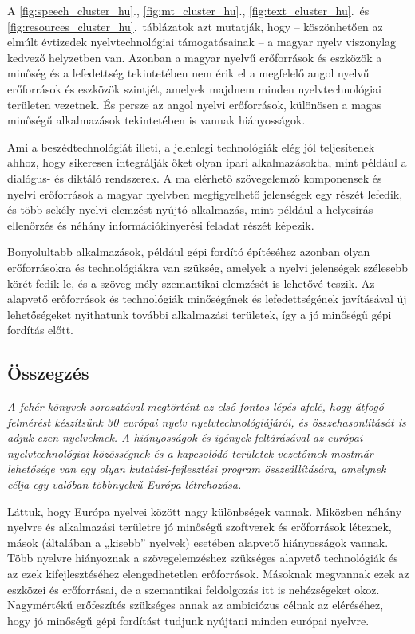 \begin{multicols}{2}
A \ref{fig:speech_cluster_hu}., \ref{fig:mt_cluster_hu}., \ref{fig:text_cluster_hu}.\ és \ref{fig:resources_cluster_hu}.~táblázatok azt mutatják, hogy -- köszönhetően az elmúlt évtizedek nyelv\-tech\-no\-ló\-giai támogatásainak -- a ma\-gyar nyelv viszonylag kedvező hely\-zet\-ben van. Azonban a magyar nyelvű erőforrások és eszközök a minőség és a lefedettség tekintetében nem érik el a megfelelő angol nyelvű erőforrások és esz\-kö\-zök szintjét, amelyek majdnem minden nyelvtechnológiai területen vezetnek. És persze az angol nyelvi erőforrások, különösen a magas minőségű alkalmazások tekintetében is vannak hiányosságok.

Ami a beszédtechnológiát illeti, a jelenlegi technológiák elég jól teljesítenek ahhoz, hogy sikeresen integrálják őket olyan ipari alkalmazásokba, mint például a dialógus- és diktáló rendszerek. A ma elérhető szövegelemző komponensek és nyelvi erőforrások a magyar nyelvben megfigyelhető jelenségek egy részét lefedik, és több sekély nyelvi elemzést nyújtó alkalmazás, mint például a helyesírás-ellenőrzés és néhány információkinyerési feladat részét képezik. 

Bonyolultabb alkalmazások, például gépi fordító építéséhez azonban olyan erőforrásokra és technológiákra van szükség, amelyek a nyelvi jelenségek szélesebb körét fedik le, és a szöveg mély szemantikai elemzését is lehetővé teszik. Az alapvető erőforrások és technológiák minőségének és lefedettségének javításával új lehetőségeket nyithatunk további alkalmazási területek, így a jó minőségű gépi fordítás előtt.

\subsection{Összegzés}

\emph{A fehér könyvek sorozatával megtörtént az első fontos lépés afelé, hogy átfogó felmérést készítsünk 30 európai nyelv nyelvtechnológiájáról, és összehasonlítását is adjuk ezen nyelveknek. A hiányosságok és igények feltárásával az európai nyelvtechnológiai közösségnek és a kapcsolódó területek vezetőinek mostmár lehetősége van egy olyan kutatási-fejlesztési program összeállítására, amelynek célja egy valóban többnyelvű Európa létrehozása.}

Láttuk, hogy Európa nyelvei között nagy különbségek vannak. Miközben néhány nyelvre és alkalmazási területre jó mi\-nő\-sé\-gű szoftverek és erőforrások léteznek, mások (általában a „kisebb” nyelvek) esetében alapvető hiányosságok vannak. Több nyelvre hiányoznak a szö\-veg\-elem\-zés\-hez szükséges alapvető technológiák és az ezek kifejlesztéséhez elengedhetetlen erőforrások. Másoknak megvannak ezek az eszközei és erőforrásai, de a szemantikai feldolgozás itt is nehézségeket okoz. Nagymértékű erőfeszítés szükséges annak az ambiciózus célnak az eléréséhez, hogy jó minőségű gépi fordítást tudjunk nyújtani minden európai nyelvre.


\end{multicols}
